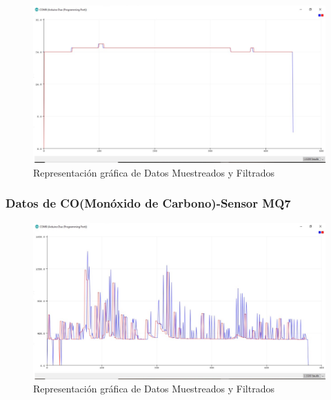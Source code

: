 \documentclass[10pt,a4paper]{article}
\begin{document}
\begin{multicols}{2}
\begin{itemize}
\begin{figure}[H]
\centering
\includegraphics[scale=0.30]{gausshumedad.PNG}
\caption{Representación gráfica de Datos Muestreados y Filtrados}
\end{figure}


\subsubsection{Datos de CO(Monóxido de Carbono)-Sensor MQ7}

\begin{figure}[H]
\centering
\includegraphics[scale=0.30]{gauusm7.PNG}
\caption{Representación gráfica de Datos Muestreados y Filtrados}
\end{figure}




\end{itemize}
\end{multicols}
\end{document}
